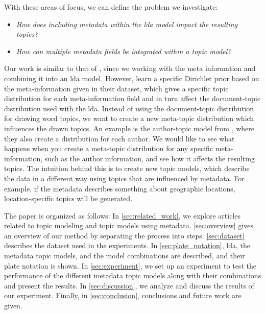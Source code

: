 With these areas of focus, we can define the problem we investigate:

\begin{itemize}
	\item \textit{How does including metadata within the \gls{lda} model impact the resulting topics?}
	\item \textit{How can multiple metadata fields be integrated within a topic model?}
\end{itemize}

Our work is similar to that of \citet{MetaLDA2017}, since we working with the meta information and combining it into an \gls{lda} model.
However, \citet{MetaLDA2017} learn a specific Dirichlet prior based on the meta-information given in their dataset, which gives a specific topic distribution for each meta-information field and in turn affect the document-topic distribution used with the \gls{lda}.
Instead of using the document-topic distribution for drawing word topics, we want to create a new meta-topic distribution which influences the drawn topics.
An example is the author-topic model from \citet{author_topic_2012}, where they also create a distribution for each author.
We would like to see what happens when you create a meta-topic distribution for any specific meta-information, such as the author information, and see how it affects the resulting topics.
The intuition behind this is to create new topic models, which describe the data in a different way using topics that are influenced by metadata.
For example, if the metadata describes something about geographic locations, location-specific topics will be generated.


The paper is organized as follows:
In \autoref{sec:related_work}, we explore articles related to topic modeling and topic models using metadata.
\autoref{sec:overview} gives an overview of our method by separating the process into steps.
\autoref{sec:dataset} describes the dataset used in the experiments.
In \autoref{sec:plate_notation}, \gls{lda}, the metadata topic models, and the model combinations are described, and their plate notation is shown.
In \autoref{sec:experiment}, we set up an experiment to test the performance of the different metadata topic models along with their combinations and present the results.
In \autoref{sec:discussion}, we analyze and discuss the results of our experiment.
Finally, in \autoref{sec:conclusion}, conclusions and future work are given.
